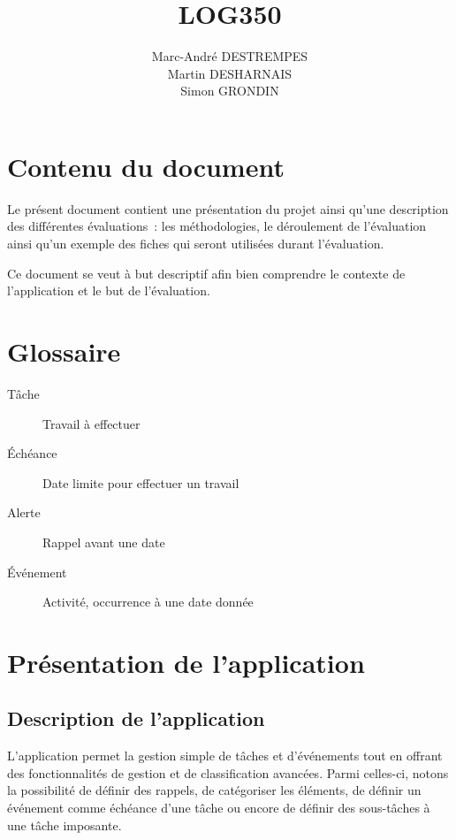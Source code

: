 \documentclass[letterpaper, oneside, 12pt,these,creativecommons]{thETS}
\title{LOG350}
\author{Marc-André DESTREMPES\\Martin DESHARNAIS\\Simon GRONDIN}
\begin{document}



\tableofcontents

\listoftables


\chapter{Contenu du document}

Le présent document contient une présentation du projet ainsi qu'une description des différentes évaluations : les méthodologies, le déroulement de l'évaluation ainsi qu'un exemple des fiches qui seront utilisées durant l'évaluation.

Ce document se veut à but descriptif afin bien comprendre le contexte de l'application et le but de l'évaluation.

\chapter{Glossaire}

\begin{description}
\item [Tâche] Travail à effectuer
\item [Échéance] Date limite pour effectuer un travail
\item [Alerte] Rappel avant une date
\item [Événement] Activité, occurrence à une date donnée
\end{description}

\glsaddall
\printglossaries

\chapter{Présentation de l'application}

\section{Description de l'application}

L’application permet la gestion simple de tâches et d’événements tout en offrant des fonctionnalités de gestion et de classification avancées. Parmi celles-ci, notons la possibilité de définir des rappels, de catégoriser les éléments, de définir un événement comme échéance d'une tâche ou encore de définir des sous-tâches à une tâche imposante.
\end{document}
